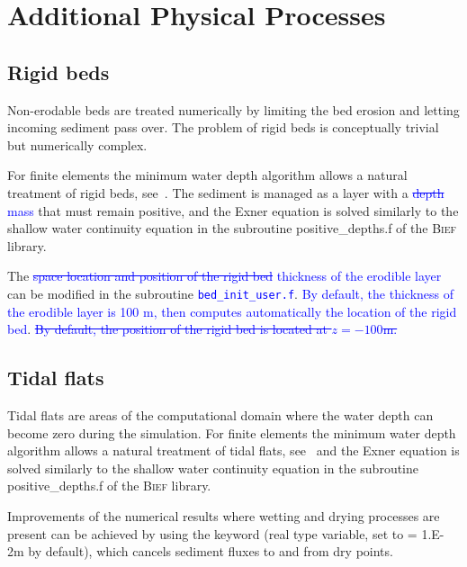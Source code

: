 \chapter[Additional Physical Processes]{Additional Physical Processes}

\section{Rigid beds}
Non-erodable beds are treated numerically by limiting the bed erosion and letting incoming sediment pass over. The problem of rigid beds is conceptually trivial but numerically complex.

For finite elements the minimum water depth algorithm allows a natural treatment of rigid
beds, see~\cite{Hervouet11}. The sediment is managed as a layer with a
\textcolor{blue}{\sout{depth}} \textcolor{blue}{mass} that must remain positive, and the Exner equation is solved similarly to the shallow water continuity equation in the subroutine {\ttfamily positive\_depths.f} of the \textsc{Bief} library.

The \textcolor{blue}{\sout{space location and position of the rigid bed}} \textcolor{blue}{thickness of the erodible layer} can be modified in the subroutine \textcolor{blue}{\texttt{bed\_init\_user.f}}. \textcolor{blue}{By default, the thickness of the erodible layer is 100 m, then \gaia{} computes automatically the location of the rigid bed}. \textcolor{blue}{\sout{By default, the position of the rigid bed is located at $z=-100$m.}}

\section{Tidal flats}
Tidal flats are areas of the computational domain where the water depth can become zero during the simulation. For finite elements the minimum water depth algorithm allows a natural treatment of tidal flats, see~\cite{Hervouet11} and the Exner equation is solved similarly to the shallow water continuity equation in the subroutine {\ttfamily positive\_depths.f} of the \textsc{Bief} library.

Improvements of the numerical results where wetting and drying processes are present can be achieved by using the keyword  (real type variable, set to {\ttfamily = 1.E-2}m by default), which cancels sediment fluxes to and from dry points.

